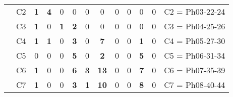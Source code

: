 \begin{table}[H]
{\begin{tabular}{|ccrrrrrrrrrrc|}
\multicolumn{1}{|c|}{}                                      & \multicolumn{1}{c|}{C2} & \multicolumn{1}{c|}{\textbf{1}} & \multicolumn{1}{c|}{\textbf{4}} & \multicolumn{1}{c|}{0}          & \multicolumn{1}{c|}{0}          & \multicolumn{1}{c|}{0}          & \multicolumn{1}{c|}{0}           & \multicolumn{1}{c|}{0}          & \multicolumn{1}{c|}{0}  & \multicolumn{1}{c|}{0}           & \multicolumn{1}{c|}{0}          & C2 = Ph03-22-24   \\ \cline{2-13}
\multicolumn{1}{|c|}{}                                      & \multicolumn{1}{c|}{C3} & \multicolumn{1}{c|}{\textbf{1}} & \multicolumn{1}{c|}{0}          & \multicolumn{1}{c|}{\textbf{1}} & \multicolumn{1}{c|}{\textbf{2}} & \multicolumn{1}{c|}{0}          & \multicolumn{1}{c|}{0}           & \multicolumn{1}{c|}{0}          & \multicolumn{1}{c|}{0}  & \multicolumn{1}{c|}{0}           & \multicolumn{1}{c|}{0}          & C3 = Ph04-25-26   \\ \cline{2-13}
\multicolumn{1}{|c|}{}                                      & \multicolumn{1}{c|}{C4} & \multicolumn{1}{c|}{\textbf{1}} & \multicolumn{1}{c|}{\textbf{1}} & \multicolumn{1}{c|}{0}          & \multicolumn{1}{c|}{\textbf{3}} & \multicolumn{1}{c|}{0}          & \multicolumn{1}{c|}{\textbf{7}}  & \multicolumn{1}{c|}{0}          & \multicolumn{1}{c|}{0}  & \multicolumn{1}{c|}{\textbf{1}}  & \multicolumn{1}{c|}{0}          & C4 = Ph05-27-30   \\ \cline{2-13}
\multicolumn{1}{|c|}{}                                      & \multicolumn{1}{c|}{C5} & \multicolumn{1}{c|}{0}          & \multicolumn{1}{c|}{0}          & \multicolumn{1}{c|}{0}          & \multicolumn{1}{c|}{\textbf{5}} & \multicolumn{1}{c|}{0}          & \multicolumn{1}{c|}{\textbf{2}}  & \multicolumn{1}{c|}{0}          & \multicolumn{1}{c|}{0}  & \multicolumn{1}{c|}{\textbf{5}}  & \multicolumn{1}{c|}{0}          & C5 = Ph06-31-34   \\ \cline{2-13}
\multicolumn{1}{|c|}{}                                      & \multicolumn{1}{c|}{C6} & \multicolumn{1}{c|}{\textbf{1}} & \multicolumn{1}{c|}{0}          & \multicolumn{1}{c|}{0}          & \multicolumn{1}{c|}{\textbf{6}} & \multicolumn{1}{c|}{\textbf{3}} & \multicolumn{1}{c|}{\textbf{13}} & \multicolumn{1}{c|}{0}          & \multicolumn{1}{c|}{0}  & \multicolumn{1}{c|}{\textbf{7}}  & \multicolumn{1}{c|}{0}          & C6 = Ph07-35-39   \\ \cline{2-13}
\multicolumn{1}{|c|}{}                                      & \multicolumn{1}{c|}{C7} & \multicolumn{1}{c|}{\textbf{1}} & \multicolumn{1}{c|}{0}          & \multicolumn{1}{c|}{0}          & \multicolumn{1}{c|}{\textbf{3}} & \multicolumn{1}{c|}{\textbf{1}} & \multicolumn{1}{c|}{\textbf{10}} & \multicolumn{1}{c|}{0}          & \multicolumn{1}{c|}{0}  & \multicolumn{1}{c|}{\textbf{8}}  & \multicolumn{1}{c|}{0}          & C7 = Ph08-40-44   \\ \cline{2-13}

\end{tabular}}
\end{table}
